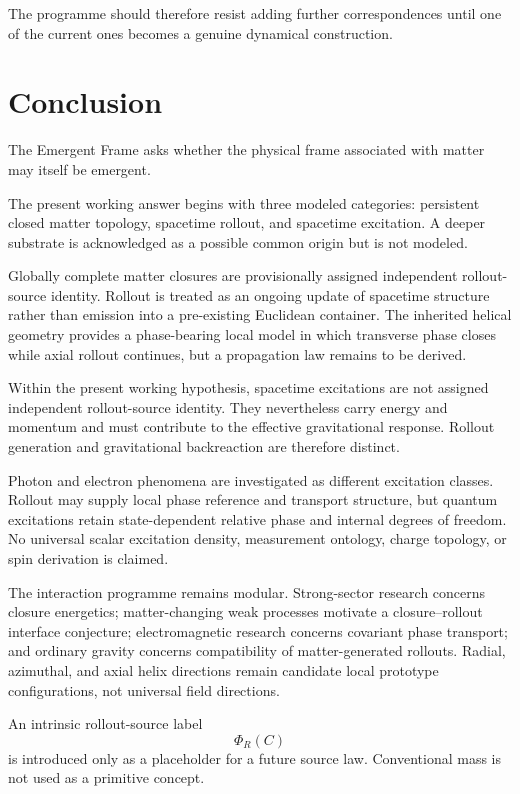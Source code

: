 \documentclass[10pt]{article}
\begin{document}
The programme should therefore resist adding further correspondences until one of the current ones becomes a genuine dynamical construction.

\section{Conclusion}\label{conclusion}

The Emergent Frame asks whether the physical frame associated with matter may itself be emergent.

The present working answer begins with three modeled categories: persistent closed matter topology, spacetime rollout, and spacetime excitation. A deeper substrate is acknowledged as a possible common origin but is not modeled.

Globally complete matter closures are provisionally assigned independent rollout-source identity. Rollout is treated as an ongoing update of spacetime structure rather than emission into a pre-existing Euclidean container. The inherited helical geometry provides a phase-bearing local model in which transverse phase closes while axial rollout continues, but a propagation law remains to be derived.

Within the present working hypothesis, spacetime excitations are not assigned independent rollout-source identity. They nevertheless carry energy and momentum and must contribute to the effective gravitational response. Rollout generation and gravitational backreaction are therefore distinct.

Photon and electron phenomena are investigated as different excitation classes. Rollout may supply local phase reference and transport structure, but quantum excitations retain state-dependent relative phase and internal degrees of freedom. No universal scalar excitation density, measurement ontology, charge topology, or spin derivation is claimed.

The interaction programme remains modular. Strong-sector research concerns closure energetics; matter-changing weak processes motivate a closure--rollout interface conjecture; electromagnetic research concerns covariant phase transport; and ordinary gravity concerns compatibility of matter-generated rollouts. Radial, azimuthal, and axial helix directions remain candidate local prototype configurations, not universal field directions.

An intrinsic rollout-source label \[
\Phi_R(C)
\] is introduced only as a placeholder for a future source law. Conventional mass is not used as a primitive concept.
\end{document}
